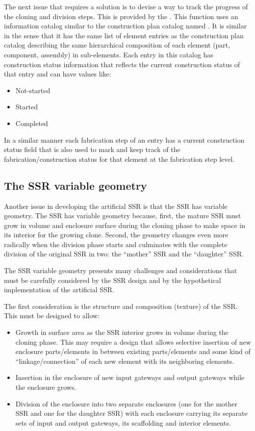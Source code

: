 The next issue that requires a solution is to devise a way to track the
progress of the cloning and division steps. This is provided by the
. This function uses an
information catalog similar to the construction plan catalog named
. It is similar in the sense that
it has the same list of element entries as the construction plan
catalog describing the same hierarchical composition of each element
(part, component, assembly) in sub-elements.  Each entry in this
catalog has construction status information that reflects the current
construction status of that entry and can have values like:

\begin{itemize}
\item Not-started
\item Started
\item Completed
\end{itemize}

In a similar manner each fabrication step of an entry has a current
construction status field that is also used to mark and keep track of
the fabrication/construction status for that element at the fabrication
step level.

\subsection[The SSR variable geometry]{The SSR variable geometry}

Another issue in developing the artificial SSR is that the SSR has variable
geometry.  The SSR has variable geometry because, first, the mature SSR must 
grow in volume and enclosure surface during the cloning phase to make space 
in its interior for the growing clone. Second, the geometry changes even more 
radically when the division phase
starts and culminates with the complete division of the original SSR in
two: the “mother” SSR and the “daughter” SSR.

The SSR variable geometry presents many challenges and considerations that must
be carefully considered by the SSR design and by the hypothetical
implementation of the artificial SSR.

The first consideration is the structure and composition (texture) of the SSR.  This
must be designed to allow:
\begin{itemize}
\item Growth in surface area as the SSR interior grows in volume during the
cloning phase. This may require a design that allows selective
insertion of new enclosure parts/elements in between existing
parts/elements and some kind of “linkage/connection” of each new
element with its neighboring elements.
\item Insertion in the enclosure of new input gateways and output
gateways while the enclosure grows.
\item Division of the enclosure into two separate enclosures (one for
the mother SSR and one for the daughter SSR)  with each enclosure
carrying its separate sets of input and output gateways, its
scaffolding and interior elements.
\end{itemize}

